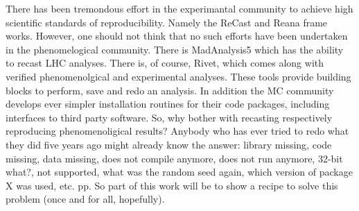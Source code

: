\documentclass[aps,prd,11pt,tightenlines,superscriptaddress,nofootinbib,preprintnumbers,notitlepage]{revtex4-1}
\begin{document}
There has been tremondous effort in the experimantal community to achieve high scientific standards of reproducibility. Namely the ReCast and Reana frame works. However, one should not think that no such efforts have been undertaken in the phenomelogical community. There is MadAnalysis5 which has the ability to recast LHC analyses. There is, of course, Rivet, which comes along with verified phenomenolgical and experimental analyses. These tools provide building blocks to perform, save and redo an analysis. In addition the MC community develops ever simpler installation routines for their code packages, including interfaces to third party software. So, why bother with recasting respectively reproducing phenomenoligical results? Anybody who has ever tried to redo what they did five years ago might already know the answer: library missing, code missing, data missing, does not compile anymore, does not run anymore, 32-bit what?, not supported, what was the random seed again, which version of package X was used, etc. pp. So part of this work will be to show a recipe to solve this problem (once and for all, hopefully).
\end{document}
